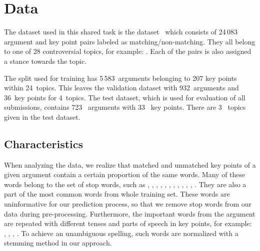 \section{Data}\label{data}

The dataset used in this shared task is the \ArgKP dataset~\cite{Bar-HaimEFKLS2020} which consists of 24\,083 argument and key point pairs labeled as matching/non-matching. They all belong to one of 28 controversial topics, for example: . Each of the pairs is also assigned a stance towards the topic. 

The split used for training has 5\,583~arguments belonging to 207 key points within 24~topics. This leaves the 
validation dataset with 932~arguments and 36~key points for 4~topics. The test dataset, which is used for evaluation of all submissions, contains 723~ arguments with 33~ key points. There are 3~ topics given in the test dataset.

\subsection{Characteristics}
When analyzing the data, we realize that matched and unmatched key points of a given argument contain a certain proportion of the same words. 
Many of these words belong to the set of stop words, such as , , , , , , , , , , , .
They are also a part of the most common words from whole training set.
These words are uninformative for our prediction process, so that we remove stop words from our data during pre-processing. 
Furthermore, the important words from the argument are repeated with different tenses and parts of speech in key points, for example: , , , . 
To achieve an unambiguous spelling, such words are normalized with a stemming method in our approach. 


